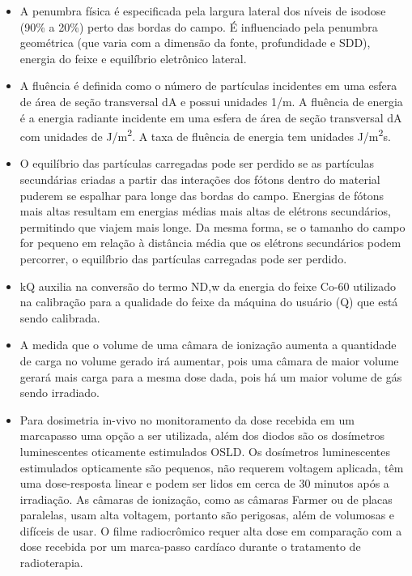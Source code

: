 \documentclass[11pt,a4paper]{article}
\newcounter{exemplo}
\begin{document}
\begin{exemplo}[Dosimetria]
\begin{itemize}
        \item A penumbra física é especificada pela largura lateral dos níveis de isodose (90\% a 20\%) perto das bordas do campo. É influenciado pela penumbra geométrica (que varia com a dimensão da fonte, profundidade e SDD), energia do feixe e equilíbrio eletrônico lateral.
        
        \item A fluência é definida como o número de partículas incidentes em uma esfera de área de seção transversal dA e possui unidades 1/m. A fluência de energia é a energia radiante incidente em uma esfera de área de seção transversal dA com unidades de J/m\textsuperscript{2}. A taxa de fluência de energia tem unidades J/m\textsuperscript{2}s.
        
        \item O equilíbrio das partículas carregadas pode ser perdido se as partículas secundárias criadas a partir das interações dos fótons dentro do material puderem se espalhar para longe das bordas do campo. Energias de fótons mais altas resultam em energias médias mais altas de elétrons secundários, permitindo que viajem mais longe. Da mesma forma, se o tamanho do campo for pequeno em relação à distância média que os elétrons secundários podem percorrer, o equilíbrio das partículas carregadas pode ser perdido.
        
        \item kQ auxilia na conversão do termo ND,w da energia do feixe Co-60 utilizado na calibração para a qualidade do feixe da máquina do usuário (Q) que está sendo calibrada.
        
        \item A medida que o volume de uma câmara de ionização aumenta a quantidade de carga no volume gerado irá aumentar, pois uma câmara de maior volume gerará mais carga para a mesma dose dada, pois há um maior volume de gás sendo irradiado.
        
        \item Para dosimetria in-vivo no monitoramento da dose recebida em um marcapasso uma opção a ser utilizada, além dos diodos são os dosímetros luminescentes oticamente estimulados OSLD. Os dosímetros luminescentes estimulados opticamente são pequenos, não requerem voltagem aplicada, têm uma dose-resposta linear e podem ser lidos em cerca de 30 minutos após a irradiação. As câmaras de ionização, como as câmaras Farmer ou de placas paralelas, usam alta voltagem, portanto são perigosas, além de volumosas e difíceis de usar. O filme radiocrômico requer alta dose em comparação com a dose recebida por um marca-passo cardíaco durante o tratamento de radioterapia.
        

\end{itemize}
\end{exemplo}
\end{document}
